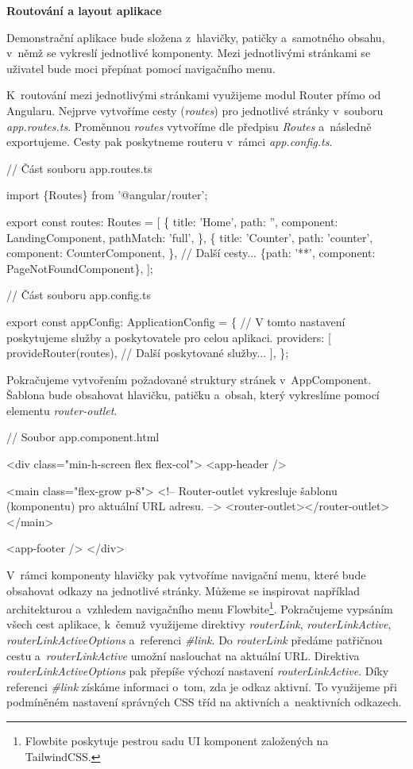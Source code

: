 \begin{flushleft}
  \textbf{Routování a layout aplikace}
\end{flushleft}

Demonstrační aplikace bude složena z~hlavičky, patičky a~samotného obsahu, v~němž se vykreslí jednotlivé komponenty. 
Mezi jednotlivými stránkami se uživatel bude moci přepínat pomocí navigačního menu.

K~routování mezi jednotlivými stránkami využijeme modul Router přímo od Angularu. Nejprve vytvoříme cesty (\emph{routes}) pro jednotlivé stránky v~souboru \emph{app.routes.ts}. 
Proměnnou \emph{routes} vytvoříme dle předpisu \emph{Routes} a~následně exportujeme. Cesty pak poskytneme routeru v~rámci \emph{app.config.ts}.

\begin{prog}
// Část souboru app.routes.ts

import \{Routes\} from '@angular/router';

export const routes: Routes = [
  \{
    title: 'Home',
    path: '',
    component: LandingComponent,
    pathMatch: 'full',
  \},
  \{
    title: 'Counter',
    path: 'counter',
    component: CounterComponent,
  \},
  // Další cesty...
  \{path: '**', component: PageNotFoundComponent\},
];

// Část souboru app.config.ts

export const appConfig: ApplicationConfig = \{
  // V tomto nastavení poskytujeme služby a poskytovatele pro celou aplikaci.
  providers: [
    provideRouter(routes),
    // Další poskytované služby...
  ],
\};
\end{prog}

Pokračujeme vytvořením požadované struktury stránek v~AppComponent. Šablona bude obsahovat hlavičku, patičku a~obsah, který vykreslíme pomocí elementu \emph{router-outlet}. 

\begin{prog}
// Soubor app.component.html

<div class="min-h-screen flex flex-col">
  <app-header />

  <main class="flex-grow p-8">
    <!-- Router-outlet vykresluje šablonu (komponentu) pro aktuální URL adresu. -->
    <router-outlet></router-outlet>
  </main>

  <app-footer />
</div>
\end{prog}

V~rámci komponenty hlavičky pak vytvoříme navigační menu, které bude obsahovat odkazy na jednotlivé stránky. 
Můžeme se inspirovat například architekturou a~vzhledem navigačního menu Flowbite\footnote{Flowbite poskytuje pestrou sadu UI komponent založených na TailwindCSS.\cite{flowbitetwheader}}. 
Pokračujeme vypsáním všech cest aplikace, k~čemuž využijeme direktivy \emph{routerLink}, \emph{routerLinkActive}, \emph{routerLinkActiveOptions} a~referenci \emph{\#link}. 
Do \emph{routerLink} předáme patřičnou cestu a~\emph{routerLinkActive} umožní naslouchat na aktuální URL. Direktiva \emph{routerLinkActiveOptions} pak přepíše výchozí nastavení \emph{routerLinkActive}.
Díky referenci \emph{\#link} získáme informaci o~tom, zda je odkaz aktivní. To využijeme při podmíněném nastavení správných CSS tříd na aktivních a~neaktivních odkazech.

